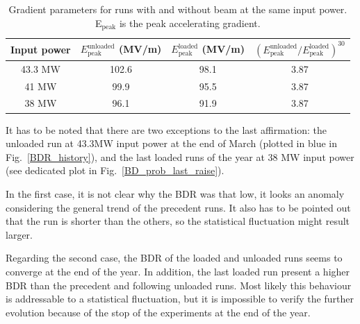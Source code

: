 \begin{table}[h]
  \centering
    \begin{tabular}{ c c c c }
    \hline
    \hline
    Input power 		&		$E^\text{unloaded} _\text{peak}$ (MV/m)		& 	$E^\text{loaded} _\text{peak}$ (MV/m)		&	$\left ( E^\text{unloaded} _\text{peak} / E^\text{loaded} _\text{peak} \right )^{30}$	\\
    \hline
    43.3 MW		&		102.6 								&	98.1									&	3.87		\\
    41 MW			&		99.9 									&	95.5									&	3.87		\\
    38 MW			&		96.1 									&	91.9									&	3.87		\\
    \hline
    \hline
    \end{tabular}
\caption{Gradient parameters for runs with and without beam at the same input power. E$_\text{peak}$ is the peak accelerating gradient.  }
\label{param_var_p}
\end{table}

It has to be noted that there are two exceptions to the last affirmation: the unloaded run at 43.3MW input power at the end of March (plotted in blue in Fig.~\ref{BDR_history}), and the last loaded runs of the year at 38 MW input power (see dedicated plot in Fig.~\ref{BD_prob_last_raise}). 

In the first case, it is not clear why the BDR was that low, it looks an anomaly considering the general trend of the precedent runs. It also has to be pointed out that the run is shorter than the others, so the statistical fluctuation might result larger.

Regarding the second case, the BDR of the loaded and unloaded runs seems to converge at the end of the year. In addition, the last loaded run present a higher BDR than the precedent and following unloaded runs. Most likely this behaviour is addressable to a statistical fluctuation, but  it is impossible to verify the further evolution because of the stop of the experiments at the end of the year.

